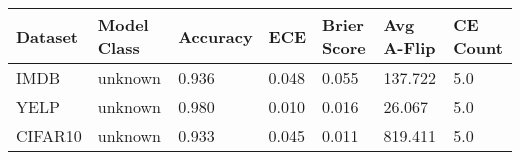 \begin{tabular}{lllllll}
\toprule
Dataset & Model Class & Accuracy & ECE & Brier Score & Avg A-Flip & CE Count \\
\midrule
IMDB & unknown & 0.936 & 0.048 & 0.055 & 137.722 & 5.0 \\
YELP & unknown & 0.980 & 0.010 & 0.016 & 26.067 & 5.0 \\
CIFAR10 & unknown & 0.933 & 0.045 & 0.011 & 819.411 & 5.0 \\
\bottomrule
\end{tabular}
